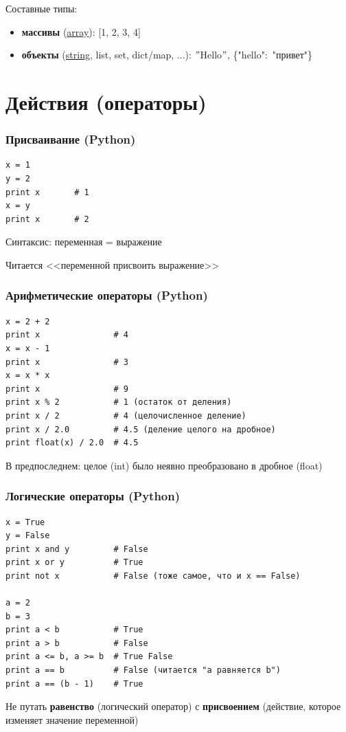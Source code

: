 {{  \vspace{1cm}
  Составные типы:
  \begin{itemize}
    \item \textbf{массивы} (\underline{array}): [1, 2, 3, 4]
    \item \textbf{объекты} (\underline{string}, list, set, dict/map, ...): $"$Hello$"$, \{"hello":~"привет"\}
  \end{itemize}
}

\section{Действия (операторы)}
\begin{frame}[fragile]
  \frametitle{Присваивание (Python)}
  \begin{verbatim}
x = 1
y = 2
print x       # 1
x = y
print x       # 2
  \end{verbatim}

  \vspace{0.5cm}
Синтаксис: переменная = выражение

Читается <<переменной присвоить выражение>>
\end{frame}

\begin{frame}[fragile]
  \frametitle{Арифметические операторы (Python)}
  \begin{verbatim}
x = 2 + 2
print x               # 4
x = x - 1
print x               # 3
x = x * x
print x               # 9
print x % 2           # 1 (остаток от деления)
print x / 2           # 4 (целочисленное деление)
print x / 2.0         # 4.5 (деление целого на дробное)
print float(x) / 2.0  # 4.5
  \end{verbatim}
В предпоследнем: целое (int) было неявно преобразовано в дробное (float)
\end{frame}

\begin{frame}[fragile]
  \frametitle{Логические операторы (Python)}
  \begin{verbatim}
x = True
y = False
print x and y         # False
print x or y          # True
print not x           # False (тоже самое, что и x == False)

a = 2
b = 3
print a < b           # True
print a > b           # False
print a <= b, a >= b  # True False
print a == b          # False (читается "a равняется b")
print a == (b - 1)    # True
  \end{verbatim}
  Не путать \textbf{равенство} (логический оператор) с \textbf{присвоением} (действие, которое изменяет значение переменной)
\end{frame}

}
